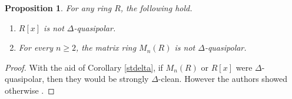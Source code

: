 \documentclass[12pt, reqno]{amsart}
\newtheorem{thm}{Theorem}[section]
\newtheorem{lem}[thm]{Lemma}
\newtheorem{prop}[thm]{Proposition}
\numberwithin{equation}{section}
\begin{document}
\begin{prop}
    For any ring $R$, the following hold.
    \begin{enumerate}
        \item $R[x]$ is not $\Delta$-quasipolar.
        \item For every $n\geq 2$, the matrix ring $M_n(R)$ is not $\Delta$-quasipolar. 
    \end{enumerate}
\end{prop}

\begin{proof}
    With the aid of Corollary \ref{stdelta}, if $M_n(R)$ or $R[x]$ were $\Delta$-quasipolar, then they would be strongly $\Delta$-clean. However the authors showed otherwise \cite[Proposition 2.21]{Danchev}.
\end{proof}










\end{document}
